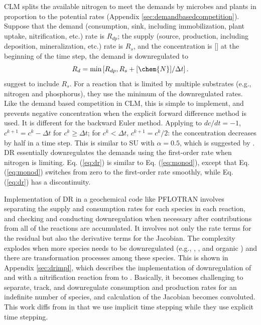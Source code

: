 \documentclass[gmd, manuscript]{copernicus}
\begin{document}
CLM splits the
available nitrogen to meet the demands by microbes and plants in
proportion to the potential rates \citep{Thornton2005} (Appendix \ref{sec:demandbasedcompetition}). Suppose that the
demand (consumption, sink, including immobilization, plant uptake,
nitrification, etc.) rate is $R_{dp}$; the supply (source, production,
including deposition, mineralization, etc.) rate is $R_s$, and the
concentration is [] at the beginning of the time step, the demand is
downregulated to
\begin{equation}
R_d=\text{min}\left[R_{dp}, R_s + {[\chem{N}]}/{\Delta t}\right].	
\label{eq:dr}
\end{equation}
\citet{Tang2015}
suggest to include $R_s$. For a reaction that is limited by multiple substrates
(e.g., nitrogen and phosphorus), they use the minimum of the downregulated
rates. Like the demand based competition in CLM, this is simple to implement,
and prevents negative concentration when the explicit forward difference method
is used.  
It is different for the backward Euler method. 
Applying to $dc/dt=-1$, $c^{k+1}=c^k-\Delta t$ for $c^k \geq \Delta t$; for
$c^k < \Delta t$, $c^{k+1} = c^k/2$: the concentration decreases by half in a
time step. This is similar to SU with $\alpha=0.5$, which is suggested by
\citet{Bethke2007}. DR essentially downregulates the demands using the
first-order rate when nitrogen is limiting. Eq. (\ref{eq:dr}) is similar
to Eq. (\ref{eq:monod}), except that Eq. (\ref{eq:monod}) switches from zero to
the first-order rate smoothly, while Eq. (\ref{eq:dr}) has a discontinuity. 

Implementation of DR in a geochemical code like PFLOTRAN involves separating
the supply and consumption rates for each species in each reaction, and
checking and conducting downregulation when necessary after contributions from
all of the reactions are accumulated. It involves not only the rate terms for
the residual but also the derivative terms for the Jacobian. The complexity
explodes when more species needs to be downregulated (e.g., ,
, and organic ) and there are transformation processes
among these species. This is shown in Appendix \ref{sec:drimpl}, which describes the
implementation of downregulation of  and  with a
nitrification reaction from  to . Basically, it
becomes challenging to separate, track, and downregulate consumption and
production rates for an indefinite number of species, and calculation of the
Jacobian becomes convoluted. This work diffs from \citet{Tang2015} in
that we use implicit time stepping while they use explicit
time stepping.
\end{document}
